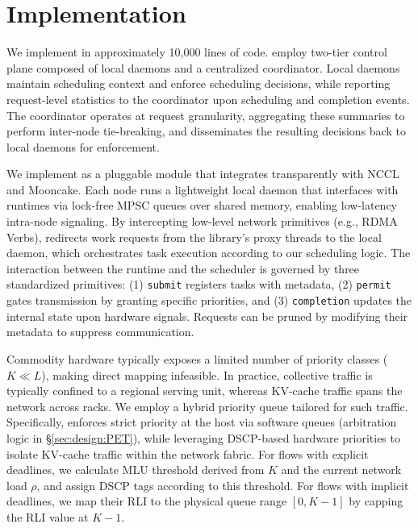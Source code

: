 \section{Implementation}

We implement \sys{} in approximately 10,000 lines of code. \sys employ two-tier control plane composed of local daemons and a centralized coordinator. Local daemons maintain scheduling context and enforce scheduling decisions, while reporting request-level statistics to the coordinator upon scheduling and completion events. The coordinator operates at request granularity, aggregating these summaries to perform inter-node tie-breaking, and disseminates the resulting decisions back to local daemons for enforcement.

We implement \sys as a pluggable module that integrates transparently with NCCL and Mooncake. Each node runs a lightweight local daemon that interfaces with runtimes via lock-free MPSC queues over shared memory, enabling low-latency intra-node signaling. By intercepting low-level network primitives (e.g., RDMA Verbs), \sys redirects work requests from the library's proxy threads to the local daemon, which orchestrates task execution according to our scheduling logic. The interaction between the runtime and the scheduler is governed by three standardized primitives: (1) \texttt{submit} registers tasks with metadata, (2) \texttt{permit} gates transmission by granting specific priorities, and (3) \texttt{completion} updates the internal state upon hardware signals. Requests can be pruned by modifying their metadata to suppress communication.

 Commodity hardware typically exposes a limited number of priority classes ($K \ll L$), making direct mapping infeasible. In practice, collective traffic is typically confined to a regional serving unit, whereas KV-cache traffic spans the network across racks. We employ a hybrid priority queue tailored for such traffic. Specifically, \sys enforces strict priority at the host via software queues (arbitration logic in \S\ref{sec:design:PET}), while leveraging DSCP-based hardware priorities to isolate KV-cache traffic within the network fabric. For flows with explicit deadlines, we calculate MLU threshold derived from $K$ and the current network load $\rho$, and assign DSCP tags according to this threshold. For flows with implicit deadlines, we map their RLI to the physical queue range $[0, K-1]$ by capping the RLI value at $K-1$.
